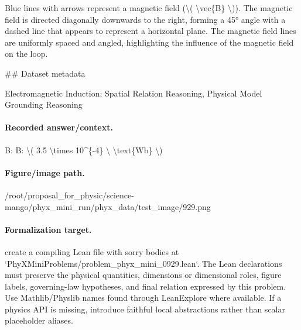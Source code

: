 Blue lines with arrows represent a magnetic field (\textbackslash{}( \textbackslash{}vec\{B\} \textbackslash{})). The magnetic field is directed diagonally downwards to the right, forming a 45° angle with a dashed line that appears to represent a horizontal plane. The magnetic field lines are uniformly spaced and angled, highlighting the influence of the magnetic field on the loop.

\#\# Dataset metadata

Electromagnetic Induction; Spatial Relation Reasoning, Physical Model Grounding Reasoning

\paragraph{Recorded answer/context.}
B: B: \textbackslash{}( 3.5 \textbackslash{}times 10\textasciicircum{}\{-4\} \textbackslash{} \textbackslash{}text\{Wb\} \textbackslash{})

\paragraph{Figure/image path.}
/root/proposal\_for\_physic/science-mango/phyx\_mini\_run/phyx\_data/test\_image/929.png

\paragraph{Formalization target.}
create a compiling Lean file with sorry bodies at `PhyXMiniProblems/problem\_phyx\_mini\_0929.lean`. The Lean declarations must preserve the physical quantities, dimensions or dimensional roles, figure labels, governing-law hypotheses, and final relation expressed by this problem.
Use Mathlib/Physlib names found through LeanExplore where available. If a physics API is missing, introduce faithful local abstractions rather than scalar placeholder aliases.

